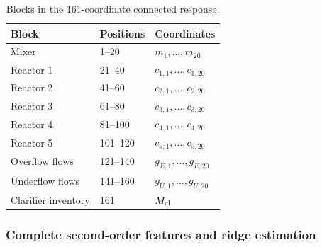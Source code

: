 \begin{table}[htbp]
\centering\small
\caption{Blocks in the 161-coordinate connected response.}
\label{tab:plant_response_positions}
\begin{tabular}{lll}
\toprule Block & Positions & Coordinates\\\midrule
Mixer & 1--20 & $m_1,\ldots,m_{20}$\\
Reactor 1 & 21--40 & $c_{1,1},\ldots,c_{1,20}$\\
Reactor 2 & 41--60 & $c_{2,1},\ldots,c_{2,20}$\\
Reactor 3 & 61--80 & $c_{3,1},\ldots,c_{3,20}$\\
Reactor 4 & 81--100 & $c_{4,1},\ldots,c_{4,20}$\\
Reactor 5 & 101--120 & $c_{5,1},\ldots,c_{5,20}$\\
Overflow flows & 121--140 & $g_{E,1},\ldots,g_{E,20}$\\
Underflow flows & 141--160 & $g_{U,1},\ldots,g_{U,20}$\\
Clarifier inventory & 161 & $M_{\rm cl}$\\
\bottomrule
\end{tabular}
\end{table}

\subsubsection{Complete second-order features and ridge estimation}

